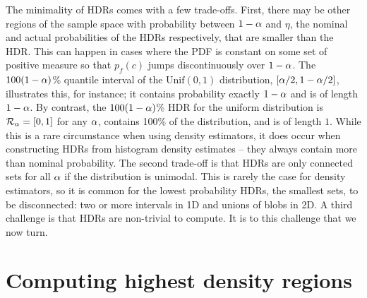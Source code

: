 The minimality of HDRs comes with a few trade-offs.
First, there may be other regions of the sample space with probability between $1 - \alpha$ and $\eta$, the nominal and actual probabilities of the HDRs respectively, that are smaller than the HDR.
This can happen in cases where the PDF is constant on some set of positive measure so that $p_{f}(c)$ jumps discontinuously over $1 - \alpha$.
The $100(1-\alpha)$\% quantile interval of the $\mbox{Unif}(0,1)$ distribution, $[\alpha/2, 1-\alpha/2]$, illustrates this, for instance; it contains probability exactly $1-\alpha$ and is of length $1-\alpha$.
By contrast, the $100(1-\alpha)$\% HDR for the uniform distribution is $\mathcal{R}_{\alpha} = [0,1]$ for any $\alpha$, contains 100\% of the distribution, and is of length $1$.
While this is a rare circumstance when using density estimators, it does occur when constructing HDRs from histogram density estimates --
they always contain more than nominal probability.
The second trade-off is that HDRs are only connected sets for all $\alpha$ if the distribution is unimodal.
This is rarely the case for density estimators, so it is common for the lowest probability HDRs, the smallest sets, to be disconnected: two or more intervals in 1D and unions of blobs in 2D.
A third challenge is that HDRs are non-trivial to compute. It is to this challenge that we now turn.





\section{Computing highest density regions}\label{sec:computing}


